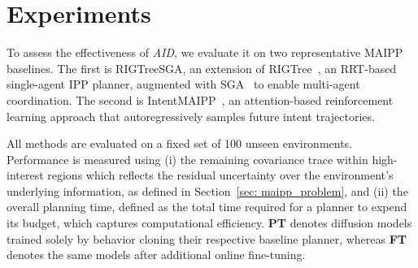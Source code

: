 \documentclass[runningheads]{llncs}
\begin{document}
\begin{table}[t]
\centering
\caption{Comparison of coverage and planning across 100 environments.}
\label{tab:aid_results}
\end{table}

\section{Experiments}
To assess the effectiveness of \textit{AID}, we evaluate it on two representative MAIPP baselines. The first is RIGTreeSGA, an extension of RIGTree~\cite{Hollinger_2014_ippsample}, an RRT-based single-agent IPP planner, augmented with SGA~\cite{corah2017efficient} to enable multi-agent coordination. The second is IntentMAIPP~\cite{yang2023intentmaipp}, an attention-based reinforcement learning approach that autoregressively samples future intent trajectories.

All methods are evaluated on a fixed set of 100 unseen environments. Performance is measured using (i) the remaining covariance trace within high-interest regions which reflects the residual uncertainty over the environment’s underlying information, as defined in Section~\ref{sec: maipp_problem}, and (ii) the overall planning time, defined as the total time required for a planner to expend its budget, which captures computational efficiency. \textbf{PT} denotes diffusion models trained solely by behavior cloning their respective baseline planner, whereas \textbf{FT} denotes the same models after additional online fine-tuning.
\end{document}
